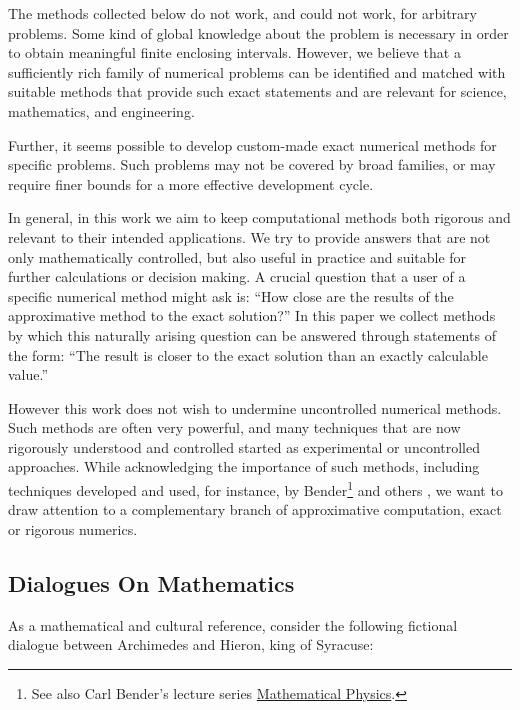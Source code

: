 \documentclass{article}
\theoremstyle{definition}
\begin{document}
The methods collected below do not work, and could not work, for arbitrary problems. Some kind of global knowledge about the problem is necessary in order to obtain meaningful finite enclosing intervals. However, we believe that a sufficiently rich family of numerical problems can be identified and matched with suitable methods that provide such exact statements and are relevant for science, mathematics, and engineering.

Further, it seems possible to develop custom-made exact numerical methods for specific problems. Such problems may not be covered by broad families, or may require finer bounds for a more effective development cycle.

In general, in this work we aim to keep computational methods both rigorous and relevant to their intended applications. We try to provide answers that are not only mathematically controlled, but also useful in practice and suitable for further calculations or decision making. A crucial question that a user of a specific numerical method might ask is: ``How close are the results of the approximative method to the exact solution?'' In this paper we collect methods by which this naturally arising question can be answered through statements of the form: ``The result is closer to the exact solution than an exactly calculable value.''

However this work does not wish to undermine uncontrolled numerical methods. Such methods are often very powerful, and many techniques that are now rigorously understood and controlled started as experimental or uncontrolled approaches. While acknowledging the importance of such methods, including techniques developed and used, for instance, by Bender\footnote{See also Carl Bender's lecture series \href{https://www.youtube.com/watch?v=LYNOGk3ZjFM&list=PL43B1963F261E6E47}{Mathematical Physics}.} and others \cite{book:Bender1999}, we want to draw attention to a complementary branch of approximative computation, exact or rigorous numerics.

\subsection{Dialogues On Mathematics}

As a mathematical and cultural reference, consider the following fictional dialogue between Archimedes and Hieron, king of Syracuse:
\end{document}
